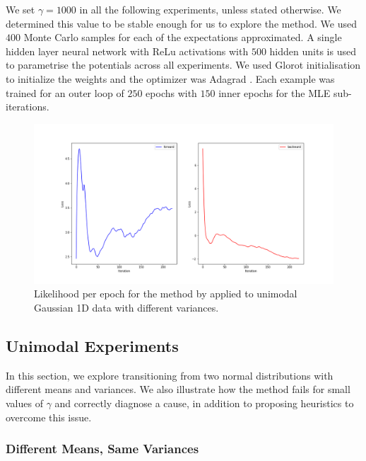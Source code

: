 \documentclass[a4paper,12pt,twoside,openright]{report}
\theoremstyle{definition}
\begin{document}
We set $\gamma=1000$ in all the following experiments, unless stated otherwise. We determined this value to be stable enough for us to explore the method. We used $400$ Monte Carlo  samples for each of the expectations approximated. A single hidden layer neural network \citep{lecun2015deep} with ReLu activations \citep{glorot2011deep} with $500$ hidden units is used to parametrise the potentials across all experiments. We used Glorot initialisation \citep{glorot2010understanding} to initialize the weights and the optimizer was Adagrad \citep{duchi2011adaptive}.  Each example was trained for an outer loop of $250$ epochs with $150$ inner epochs for the MLE sub-iterations. 
\begin{figure}
    \centering
    \includegraphics[scale=0.4,trim={2.3cm 1cm 2.5cm 0}, clip]{images/Pavon/pavon convergence big var.png} \vspace{-0.6cm}
    \caption{Likelihood per epoch for the method by \cite{pavon2018data} applied to unimodal Gaussian 1D data with different variances. }
    \label{fig:small_to_big_convergence}
\end{figure}
\subsection{Unimodal Experiments}

In this section, we explore transitioning from two normal distributions with different means and variances. We also illustrate how the method fails for small values of $\gamma$ and correctly diagnose a cause, in addition to proposing heuristics to overcome this issue. 

\subsubsection{Different Means, Same Variances}
\end{document}
